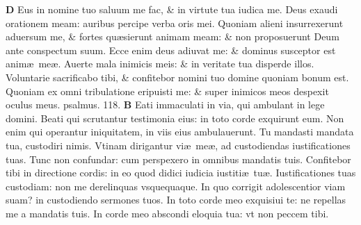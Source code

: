 \documentclass[a5paper,10pt]{book}
\def\ae{æ}
\begin{document}
\begin{multicols*}{2}
\lettrine[lines=2]{\bfseries D}{}
Eus in nomine tuo saluum me fac, \& in virtute tua iudica me.
\newline \color{red} D\color{black}eus exaudi orationem meam: auribus percipe verba oris mei.
\newline \color{red} Q\color{black}uoniam alieni insurrexerunt aduersum me, \& fortes qu\ae sierunt animam meam: \& non proposuerunt Deum ante conspectum suum.
\newline \color{red} E\color{black}cce enim deus adiuvat me: \& dominus susceptor est anim\ae \ me\ae .
\newline \color{red} A\color{black}uerte mala inimicis meis: \& in veritate tua disperde illos.
\newline \color{red} V\color{black}oluntarie sacrificabo tibi, \& confitebor nomini tuo domine quoniam bonum est.
\newline \color{red} Q\color{black}uoniam ex omni tribulatione eripuisti me: \& super inimicos meos despexit oculus meus. \quad \color{red} psalmus. 118. \color{black}
\vspace{-.5em}
\lettrine[lines=2]{\bfseries \color{red} B}{}
Eati immaculati in via, qui ambulant in lege domini.
\newline \color{red} B\color{black}eati qui scrutantur testimonia eius: in toto corde exquirunt eum.
\newline \color{red} N\color{black}on enim qui operantur iniquitatem, in viis eius ambulauerunt.
\newline \color{red} T\color{black}u mandasti mandata tua, custodiri nimis.
\newline \color{red} V\color{black}tinam dirigantur vi\ae \ me\ae , ad custodiendas iustificationes tuas.
\newline \color{red} T\color{black}unc non confundar: cum perspexero in omnibus mandatis tuis.
\newline \color{red} C\color{black}onfitebor tibi in directione cordis: in eo quod didici iudicia iustiti\ae \ tu\ae .
\newline \color{red} I\color{black}ustificationes tuas custodiam: non me derelinquas vsquequaque.
\newline \color{red} I\color{black}n quo corrigit adolescentior viam suam? in custodiendo sermones tuos.
\newline \color{red} I\color{black}n toto corde meo exquisiui te: ne repellas me a mandatis tuis.
\newline \color{red} I\color{black}n corde meo abscondi eloquia tua: vt non peccem tibi.

\end{multicols*}
\end{document}
